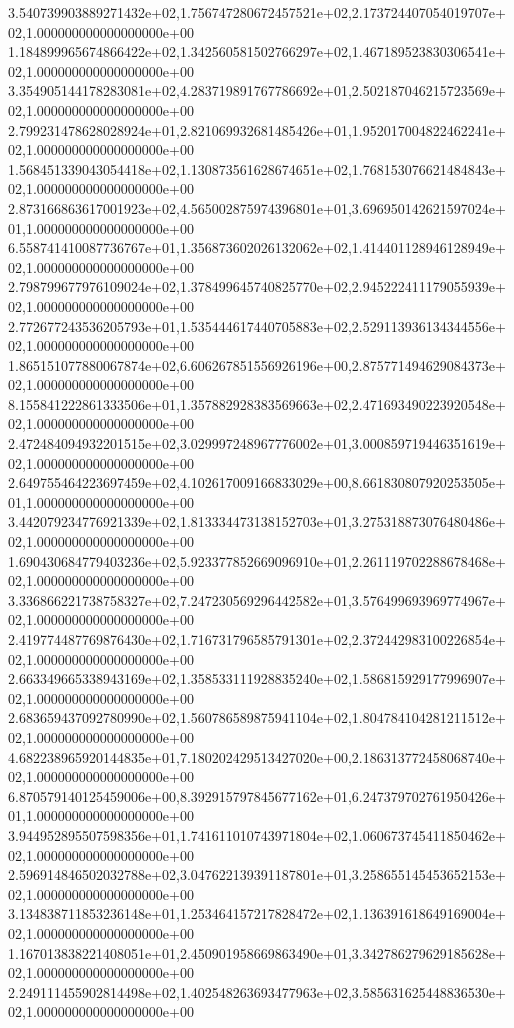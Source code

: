 3.540739903889271432e+02,1.756747280672457521e+02,2.173724407054019707e+02,1.000000000000000000e+00
1.184899965674866422e+02,1.342560581502766297e+02,1.467189523830306541e+02,1.000000000000000000e+00
3.354905144178283081e+02,4.283719891767786692e+01,2.502187046215723569e+02,1.000000000000000000e+00
2.799231478628028924e+01,2.821069932681485426e+01,1.952017004822462241e+02,1.000000000000000000e+00
1.568451339043054418e+02,1.130873561628674651e+02,1.768153076621484843e+02,1.000000000000000000e+00
2.873166863617001923e+02,4.565002875974396801e+01,3.696950142621597024e+01,1.000000000000000000e+00
6.558741410087736767e+01,1.356873602026132062e+02,1.414401128946128949e+02,1.000000000000000000e+00
2.798799677976109024e+02,1.378499645740825770e+02,2.945222411179055939e+02,1.000000000000000000e+00
2.772677243536205793e+01,1.535444617440705883e+02,2.529113936134344556e+02,1.000000000000000000e+00
1.865151077880067874e+02,6.606267851556926196e+00,2.875771494629084373e+02,1.000000000000000000e+00
8.155841222861333506e+01,1.357882928383569663e+02,2.471693490223920548e+02,1.000000000000000000e+00
2.472484094932201515e+02,3.029997248967776002e+01,3.000859719446351619e+02,1.000000000000000000e+00
2.649755464223697459e+02,4.102617009166833029e+00,8.661830807920253505e+01,1.000000000000000000e+00
3.442079234776921339e+02,1.813334473138152703e+01,3.275318873076480486e+02,1.000000000000000000e+00
1.690430684779403236e+02,5.923377852669096910e+01,2.261119702288678468e+02,1.000000000000000000e+00
3.336866221738758327e+02,7.247230569296442582e+01,3.576499693969774967e+02,1.000000000000000000e+00
2.419774487769876430e+02,1.716731796585791301e+02,2.372442983100226854e+02,1.000000000000000000e+00
2.663349665338943169e+02,1.358533111928835240e+02,1.586815929177996907e+02,1.000000000000000000e+00
2.683659437092780990e+02,1.560786589875941104e+02,1.804784104281211512e+02,1.000000000000000000e+00
4.682238965920144835e+01,7.180202429513427020e+00,2.186313772458068740e+02,1.000000000000000000e+00
6.870579140125459006e+00,8.392915797845677162e+01,6.247379702761950426e+01,1.000000000000000000e+00
3.944952895507598356e+01,1.741611010743971804e+02,1.060673745411850462e+02,1.000000000000000000e+00
2.596914846502032788e+02,3.047622139391187801e+01,3.258655145453652153e+02,1.000000000000000000e+00
3.134838711853236148e+01,1.253464157217828472e+02,1.136391618649169004e+02,1.000000000000000000e+00
1.167013838221408051e+01,2.450901958669863490e+01,3.342786279629185628e+02,1.000000000000000000e+00
2.249111455902814498e+02,1.402548263693477963e+02,3.585631625448836530e+02,1.000000000000000000e+00
